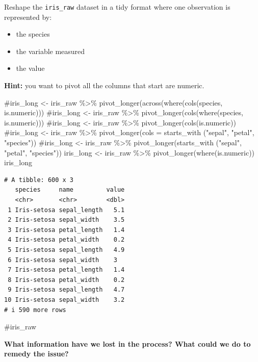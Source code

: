 \documentclass[
  letterpaper,
  DIV=11,
  numbers=noendperiod]{scrartcl}
\newenvironment{Shaded}{\begin{snugshade}}{\end{snugshade}}
\newcommand{\CommentTok}[1]{\textcolor[rgb]{0.37,0.37,0.37}{#1}}
\newcommand{\FunctionTok}[1]{\textcolor[rgb]{0.28,0.35,0.67}{#1}}
\newcommand{\NormalTok}[1]{\textcolor[rgb]{0.00,0.23,0.31}{#1}}
\newcommand{\OtherTok}[1]{\textcolor[rgb]{0.00,0.23,0.31}{#1}}
\newcommand{\SpecialCharTok}[1]{\textcolor[rgb]{0.37,0.37,0.37}{#1}}
\begin{document}
Reshape the \texttt{iris\_raw} dataset in a tidy format where one
observation is represented by:

\begin{itemize}
\item
  the species
\item
  the variable measured
\item
  the value
\end{itemize}

\textbf{Hint:} you want to pivot all the columns that start are numeric.

\begin{Shaded}
\begin{Highlighting}[]
\CommentTok{\#iris\_long \textless{}{-} iris\_raw \%\textgreater{}\% pivot\_longer(across(where(cols(species, is.numeric)))}
\CommentTok{\#iris\_long \textless{}{-} iris\_raw \%\textgreater{}\% pivot\_longer(cols(where(species, is.numeric)))}
\CommentTok{\#iris\_long \textless{}{-} iris\_raw \%\textgreater{}\% pivot\_longer(cols(is.numeric))}
\CommentTok{\#iris\_long \textless{}{-} iris\_raw \%\textgreater{}\% pivot\_longer(cols = starts\_with ("sepal", "petal", "species"))}
\CommentTok{\#iris\_long \textless{}{-} iris\_raw \%\textgreater{}\% pivot\_longer(starts\_with ("sepal", "petal", "species"))}
\NormalTok{iris\_long }\OtherTok{\textless{}{-}}\NormalTok{ iris\_raw }\SpecialCharTok{\%\textgreater{}\%} \FunctionTok{pivot\_longer}\NormalTok{(}\FunctionTok{where}\NormalTok{(is.numeric))}
\NormalTok{iris\_long}
\end{Highlighting}
\end{Shaded}

\begin{verbatim}
# A tibble: 600 x 3
   species     name         value
   <chr>       <chr>        <dbl>
 1 Iris-setosa sepal_length   5.1
 2 Iris-setosa sepal_width    3.5
 3 Iris-setosa petal_length   1.4
 4 Iris-setosa petal_width    0.2
 5 Iris-setosa sepal_length   4.9
 6 Iris-setosa sepal_width    3  
 7 Iris-setosa petal_length   1.4
 8 Iris-setosa petal_width    0.2
 9 Iris-setosa sepal_length   4.7
10 Iris-setosa sepal_width    3.2
# i 590 more rows
\end{verbatim}

\begin{Shaded}
\begin{Highlighting}[]
\CommentTok{\#iris\_raw}
\end{Highlighting}
\end{Shaded}

\textbf{What information have we lost in the process? What could we do
to remedy the issue?}
\end{document}
